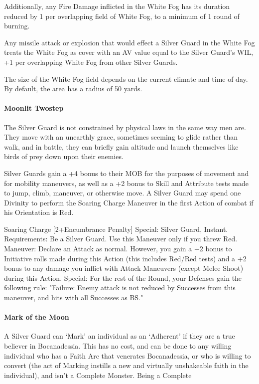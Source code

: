 \documentclass[oneside,11pt,english]{book}
\begin{document}
Additionally, any Fire Damage inflicted in the White Fog has its duration reduced by 1 per 
overlapping field of White Fog, to a minimum of 1 round of burning. 


Any missile attack or explosion that would effect a Silver Guard in the White Fog treats the White Fog as cover with an AV value equal to the Silver Guard's WIL, +1 per overlapping White Fog from other Silver Guards. 


The size of the White Fog field depends on the current climate and time of day. By default, the area has a radius of 50 yards.
\paragraph{Moonlit Twostep}
The Silver Guard is not constrained by physical laws in the same way men are. They move with 
an unearthly grace, sometimes seeming to glide rather than walk, and in battle, they can briefly 
gain altitude and launch themselves like birds of prey down upon their enemies. 


Silver Guards gain a +4 bonus to their MOB for the purposes of movement and for mobility 
maneuvers, as well as a +2 bonus to Skill and Attribute tests made to jump, climb, maneuver, or 
otherwise move. A Silver Guard may spend one Divinity to perform the Soaring Charge 
Maneuver in the first Action of combat if his Orientation is Red. 


Soaring Charge  %
[2+Encumbrance Penalty] 
Special: Silver Guard, Instant. 
Requirements: Be a Silver Guard. Use this Maneuver only if you threw Red. 
Maneuver: Declare an Attack as normal. However, you gain a +2 bonus to Initiative rolls made 
during this Action (this includes Red/Red tests) and a +2 bonus to any damage you inflict with 
Attack Maneuvers (except Melee Shoot) during this Action. 
Special: For the rest of the Round, your Defenses gain the following rule: "Failure: Enemy 
attack is not reduced by Successes from this maneuver, and hits with all Successes as BS." 


\paragraph{Mark of the Moon}
A Silver Guard can ‘Mark’ an individual as an ‘Adherent’ if they are a true believer in 
Bocanadessia. This has no cost, and can be done to any willing individual who has a Faith Arc 
that venerates Bocanadessia, or who is willing to convert (the act of Marking instills a new and 
virtually unshakeable faith in the individual), and isn't a Complete Monster. Being a Complete 
\end{document}
